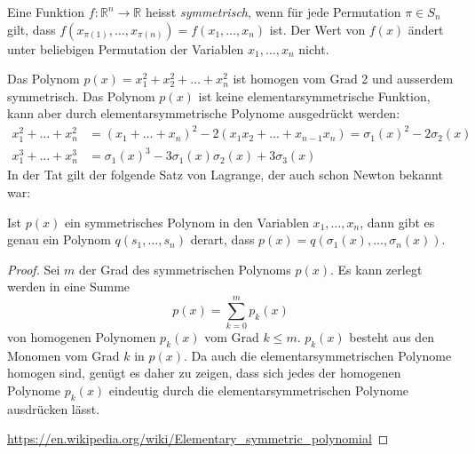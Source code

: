 \begin{definition}
Eine Funktion $f\colon\mathbb{R}^n\to\mathbb{R}$ heisst {\em symmetrisch},
wenn für jede Permutation $\pi\in S_n$ gilt, dass
$f(x_{\pi(1)},\dots,x_{\pi(n)})=f(x_1,\dots,x_n)$
ist.
Der Wert von $f(x)$ ändert unter beliebigen Permutation der Variablen
$x_1,\dots,x_n$ nicht.
\end{definition}

Das Polynom $p(x)=x_1^2+x_2^2+\dots+x_n^2$ ist homogen vom Grad 2 und
ausserdem symmetrisch.
Das Polynom $p(x)$ ist keine elementarsymmetrische Funktion, kann
aber durch elementarsymmetrische Polynome ausgedrückt werden:
\begin{align*}
x_1^2 + \dots + x_n^2
&=
(x_1+\dots+x_n)^2 - 2(x_1x_2+\dots+x_{n-1}x_n)
=
\sigma_1(x)^2 -2 \sigma_2(x)
\\
x_1^3+\dots+x_n^3
&=
\sigma_1(x)^3
-3\sigma_1(x)\sigma_2(x)
+3\sigma_3(x)
\end{align*}
In der Tat gilt der folgende Satz von Lagrange, der auch schon
Newton bekannt war:

\begin{satz}[Lagrange]
Ist $p(x)$ ein symmetrisches Polynom in den Variablen $x_1,\dots,x_n$,
dann gibt es genau ein Polynom $q(s_1,\dots,s_n)$ derart, dass
$p(x)=q(\sigma_1(x),\dots,\sigma_n(x))$.
\end{satz}

\begin{proof}
Sei $m$ der Grad des symmetrischen Polynoms $p(x)$.
Es kann zerlegt werden in eine Summe
\[
p(x)
=
\sum_{k=0}^m
p_k(x)
\]
von homogenen Polynomen $p_k(x)$ vom Grad $k\le m$. $p_k(x)$ besteht
aus den Monomen vom Grad $k$ in $p(x)$.
Da auch die elementarsymmetrischen Polynome
homogen sind, genügt es daher zu zeigen, dass sich jedes der homogenen
Polynome $p_k(x)$ eindeutig durch die elementarsymmetrischen Polynome
ausdrücken lässt.

\url{https://en.wikipedia.org/wiki/Elementary_symmetric_polynomial}
\end{proof}

